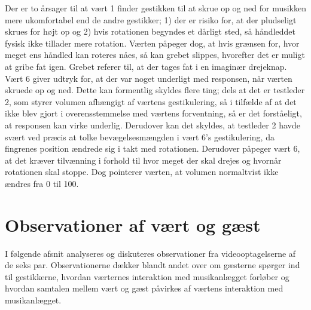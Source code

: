 Der er to årsager til at vært 1 finder gestikken til at skrue op og ned for musikken mere ukomfortabel end de andre gestikker; 1) der er risiko for, at der pludseligt skrues for højt op og 2) hvis rotationen begyndes et dårligt sted, så håndleddet fysisk ikke tillader mere rotation. Værten påpeger dog, at hvis grænsen for, hvor meget ens håndled kan roteres nåes, så kan grebet slippes, hvorefter det er muligt at gribe fat igen. Grebet referer til, at der tages fat i en imaginær drejeknap. Vært 6 giver udtryk for, at der var noget underligt med responsen, når værten skruede op og ned. Dette kan formentlig skyldes flere ting; dels at det er testleder 2, som styrer volumen afhængigt af værtens gestikulering, så i tilfælde af at det ikke blev gjort i overensstemmelse med værtens forventning, så er det forståeligt, at responsen kan virke underlig. Derudover kan det skyldes, at testleder 2 havde svært ved præcis at tolke bevægelsesmængden i vært 6's gestikulering, da fingrenes position ændrede sig i takt med rotationen. Derudover påpeger vært 6, at det kræver tilvænning i forhold til hvor meget der skal drejes og hvornår rotationen skal stoppe. Dog pointerer værten, at volumen normaltvist ikke ændres fra 0 til 100. 
%
\section{Observationer af vært og gæst}
\label{TestresultaterSocialAcceptGestikkerObservationer}
%
I følgende afsnit analyseres og diskuteres observationer fra videooptagelserne af de seks par. Observationerne dækker blandt andet over om gæsterne spørger ind til gestikkerne, hvordan værternes interaktion med musikanlægget forløber og hvordan samtalen mellem vært og gæst påvirkes af værtens interaktion med musikanlægget.
%
